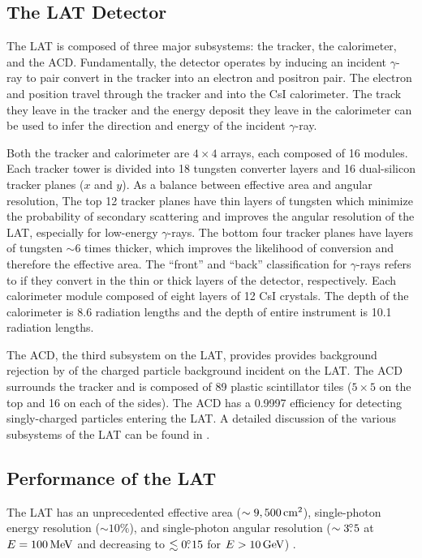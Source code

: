 \subsection{The \acs{LAT} Detector}

The \ac{LAT} is composed of three major subsystems: the tracker, the
calorimeter, and the \ac{ACD}. Fundamentally, the detector operates by
inducing an incident $\gamma$-ray to pair convert in the tracker into
an electron and positron pair. The electron and position travel through
the tracker and into the \ac{CsI} calorimeter.  The track they leave in
the tracker and the energy deposit they leave in the calorimeter can be
used to infer the direction and energy of the incident $\gamma$-ray.

Both the tracker and calorimeter are $4\times4$ arrays, each composed of
16 modules.  Each tracker tower is divided into 18 tungsten converter
layers and 16 dual-silicon tracker planes ($x$ and $y$).  As a balance
between effective area and angular resolution, The top 12 tracker planes
have thin layers of tungsten which minimize the probability of secondary
scattering and improves the angular resolution of the \ac{LAT}, especially
for low-energy $\gamma$-rays. The bottom four tracker planes have layers
of tungsten $\sim6$ times thicker, which improves the likelihood of
conversion and therefore the effective area.  The ``front'' and ``back''
classification for $\gamma$-rays refers to if they convert in the thin
or thick layers of the detector, respectively.  Each calorimeter module
composed of eight layers of 12 \ac{CsI} crystals. The depth of the
calorimeter is 8.6 radiation lengths and the depth of entire instrument
is 10.1 radiation lengths.

The \ac{ACD}, the third subsystem on the \ac{LAT}, provides provides
background rejection by of the charged particle background incident
on the \ac{LAT}.  The \ac{ACD} surrounds the tracker and is composed
of 89 plastic scintillator tiles ($5\times5$ on the top and 16
on each of the sides). The \ac{ACD} has a 0.9997 efficiency for
detecting singly-charged particles entering the \ac{LAT}.  A detailed
discussion of the various subsystems of the LAT can be found in
\citep{atwood_2009a_large-telescope}.

\subsection{Performance of the \acs{LAT}}

The \ac{LAT} 
has an unprecedented effective area ($\sim9,500\,\text{cm}^2$),
single-photon energy resolution ($\sim10\%$), and single-photon
angular resolution ($\sim3\mbox{$.\!\!^\circ$}5$ at $E=100\,\text{MeV}$
and decreasing to $\lesssim0\mbox{$.\!\!^\circ$}15$ for $E>10\,\text{GeV}$)
\citep{atwood_2009a_large-telescope}.

